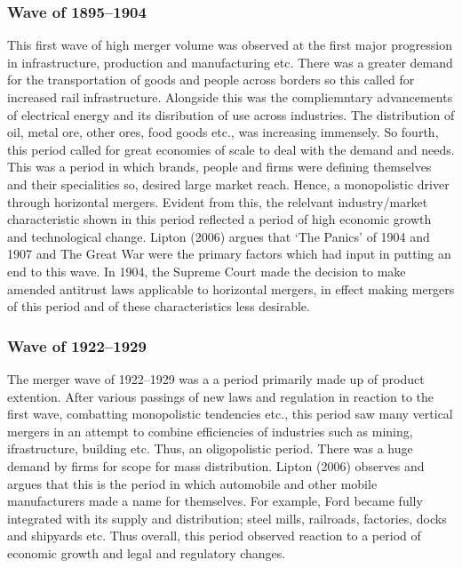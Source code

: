 \documentclass[11pt, english]{article}
\begin{document}
		\subsubsection*{Wave of 1895--1904}

	This first wave of high merger volume was observed at the first major progression in infrastructure, production and manufacturing etc. There was a greater demand for the transportation of goods and people across borders so this called for increased rail infrastructure. Alongside this was the compliemntary advancements of electrical energy and its disribution of use across industries. The distribution of oil, metal ore, other ores, food goods etc., was increasing immensely. So fourth, this period called for great economies of scale to deal with the demand and needs. This was a period in which brands, people and firms were defining themselves and their specialities so, desired large market reach. Hence, a monopolistic driver through horizontal mergers. Evident from this, the relelvant industry/market characteristic shown in this period reflected a period of high economic growth and technological change. Lipton (2006) argues that `The Panics' of 1904 and 1907 and The Great War were the primary factors which had input in putting an end to this wave. In 1904, the Supreme Court made the decision to make amended antitrust laws applicable to horizontal mergers, in effect making mergers of this period and of these characteristics less desirable.

		\subsubsection*{Wave of 1922--1929}

	The merger wave of 1922--1929 was a a period primarily made up of product extention. After various passings of new laws and regulation in reaction to the first wave, combatting monopolistic tendencies etc., this period saw many vertical mergers in an attempt to combine efficiencies of industries such as mining, ifrastructure, building etc. Thus, an oligopolistic period. There was a huge demand by firms for scope for mass distribution. Lipton (2006) observes and argues that this is the period in which automobile and other mobile manufacturers made a name for themselves. For example, Ford became fully integrated with its supply and distribution; steel mills, railroads, factories, docks and shipyards etc. Thus overall, this period observed reaction to a period of economic growth and legal and regulatory changes.
\end{document}
